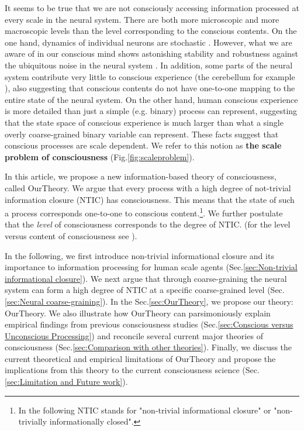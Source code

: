 \documentclass[utf8]{article}
\begin{document}
		It seems to be true that we are not consciously accessing information processed at every scale in the neural system. There are both more microscopic and more macroscopic levels than the level corresponding to the conscious contents. On the one hand, dynamics of individual neurons are stochastic \citep{Goldwyn2011, White2000}. However, what we are aware of in our conscious mind shows astonishing stability and robustness against the ubiquitous noise in the neural system \citep{mathis1995computational}. In addition, some parts of the neural system contribute very little to conscious experience (the cerebellum for example \citep{lemon2010life}), also suggesting that conscious contents do not have one-to-one mapping to the entire state of the neural system. On the other hand, human conscious experience is more detailed than just a simple (e.g. binary) process can represent, suggesting that the state space of conscious experience is much larger than what a single overly coarse-grained binary variable can represent. These facts suggest that conscious processes are scale dependent. We refer to this notion as \textbf{the scale problem of consciousness} (Fig.\ref{fig:scaleproblem}).

		In this article, we propose a new information-based theory of consciousness, called \ac{OurTheory}. We argue that every process with a high degree of not-trivial information closure (NTIC) has consciousness. This means that the state of such a process corresponds one-to-one to conscious content.\footnote{In the following NTIC stands for "non-trivial informational closure" or "non-trivially informationally closed".}. We further postulate that the \textit{level} of consciousness corresponds to the degree of NTIC. (for the level versus content of consciousness see \cite{laureys2005neural, overgaard2010neural}).
		
		In the following, we first introduce non-trivial informational closure and its importance to information processing for human scale agents (Sec.\ref{sec:Non-trivial informational closure}). We next argue that through coarse-graining the neural system can form a high degree of NTIC at a specific coarse-grained level (Sec.\ref{sec:Neural coarse-graining}). In the Sec.\ref{sec:OurTheory}, we propose our theory: \acf{OurTheory}. We also illustrate how \ac{OurTheory} can parsimoniously explain empirical findings from previous consciousness studies (Sec.\ref{sec:Conscious versus Unconscious Processing}) and reconcile several current major theories of consciousness (Sec.\ref{sec:Comparison with other theories}). Finally, we discuss the current theoretical and empirical limitations of \ac{OurTheory} and propose the implications from this theory to the current consciousness science (Sec.\ref{sec:Limitation and Future work}). 
\end{document}
